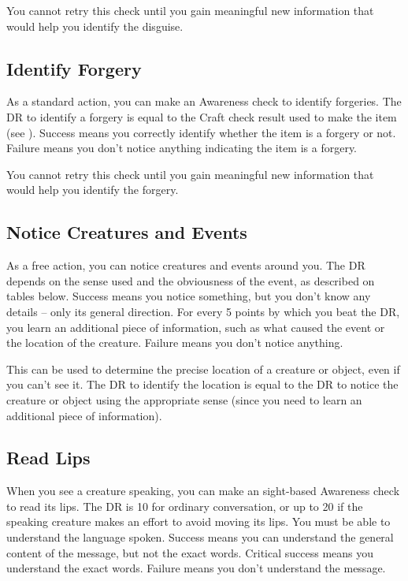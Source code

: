        You cannot retry this check until you gain meaningful new information that would help you identify the disguise.

    \subsection{Identify Forgery}
        As a standard action, you can make an Awareness check to identify forgeries.
        The DR to identify a forgery is equal to the Craft check result used to make the item (see ).
        Success means you correctly identify whether the item is a forgery or not.
        Failure means you don't notice anything indicating the item is a forgery.

        You cannot retry this check until you gain meaningful new information that would help you identify the forgery.

    \subsection{Notice Creatures and Events}
        As a free action, you can notice creatures and events around you.
        The DR depends on the sense used and the obviousness of the event, as described on tables below.
        Success means you notice something, but you don't know any details -- only its general direction.
        For every 5 points by which you beat the DR, you learn an additional piece of information, such as what caused the event or the location of the creature.
        Failure means you don't notice anything.

        This can be used to determine the precise location of a creature or object, even if you can't see it. The DR to identify the location is equal to the DR to notice the creature or object using the appropriate sense  (since you need to learn an additional piece of information).

    \subsection{Read Lips}
        When you see a creature speaking, you can make an sight-based Awareness check to read its lips.
        The DR is 10 for ordinary conversation, or up to 20 if the speaking creature makes an effort to avoid moving its lips.
        You must be able to understand the language spoken.
        Success means you can understand the general content of the message, but not the exact words.
        Critical success means you understand the exact words.
        Failure means you don't understand the message.

